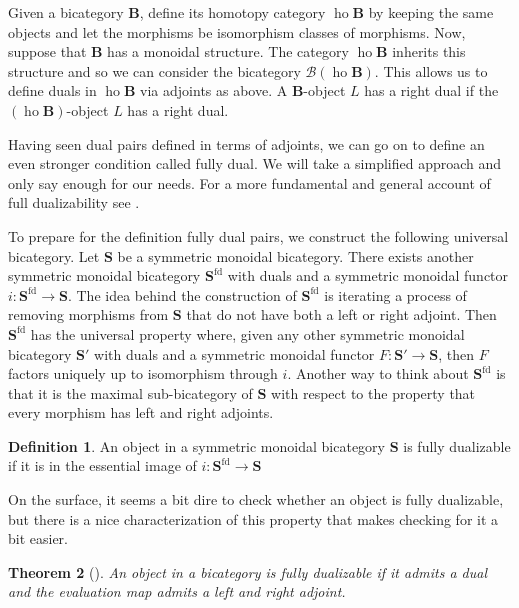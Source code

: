 \documentclass[11pt]{amsart}
\newcommand{\op}[1]{\operatorname{#1}}
\newcommand{\cat}[1]{\mathbf{#1}}
\newcommand{\from}{\colon}
\newtheorem{thm}{Theorem}[section]
\theoremstyle{remark}
\theoremstyle{definition}
\newtheorem{defn}[thm]{Definition}
\begin{document}
Given a bicategory $\cat{B}$, define its homotopy category $\op{ho} \cat{B}$ by keeping the same objects and let the morphisms be isomorphism classes of morphisms. Now, suppose that $\cat{B}$ has a monoidal structure. The category $\op{ho} \cat{B}$ inherits this structure and so we can consider the bicategory $\mathcal{B} (\op{ho} \cat{B})$. This allows us to define duals in $\op{ho}\cat{B}$ via adjoints as above. A $\cat{B}$-object $L$ has a right dual if the $(\op{ho} \cat{B})$-object $L$ has a right dual.

Having seen dual pairs defined in terms of adjoints, we can go on to define an even stronger condition called fully dual.  We will take a simplified approach and only say enough for our needs. For a more fundamental and general account of full dualizability see \cite{Lurie,Piotr}. 

To prepare for the definition fully dual pairs, we construct the following universal bicategory. Let $\cat{S}$ be a symmetric monoidal bicategory. There exists another symmetric monoidal bicategory $\cat{S}^{\text{fd}}$ with duals and a symmetric monoidal functor $i \from \cat{S}^{\text{fd}} \to \cat{S}$.  The idea behind the construction of $\cat{S}^{\text{fd}}$ is iterating a process of removing morphisms from $\cat{S}$ that do not have both a left or right adjoint. Then $\cat{S}^{\text{fd}}$ has the universal property where, given any other symmetric monoidal bicategory $\cat{S}'$ with duals and a symmetric monoidal functor $F \from \cat{S}' \to \cat{S}$, then $F$ factors uniquely up to isomorphism through $i$. Another way to think about $\cat{S}^{\text{fd}}$ is that it is the maximal sub-bicategory of $\cat{S}$ with respect to the property that every morphism has left and right adjoints.  

\begin{defn}
\label{def:FullDual}
	An object in a symmetric monoidal bicategory $\cat{S}$ is fully dualizable if it is in the essential image of $i \from \cat{S}^{\text{fd}} \to \cat{S}$
\end{defn}  

On the surface, it seems a bit dire to check whether an object is fully dualizable, but there is a nice characterization of this property that makes checking for it a bit easier.

\begin{thm}[{\cite[Prop.~4.2.3]{Lurie}}]
	An object in a bicategory is fully dualizable if it admits a dual and the evaluation map admits a left and right adjoint.  
\end{thm}
\end{document}

